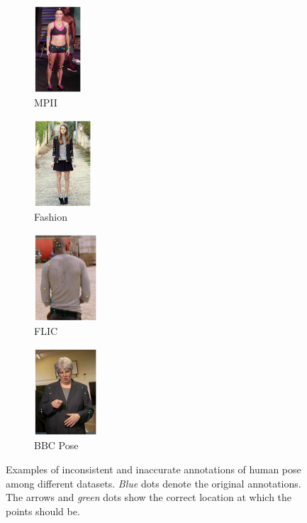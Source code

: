 \begin{figure}[t!]
    \centering
    \begin{subfigure}[b]{0.09125\textwidth}
            \includegraphics[height=3.25cm]{resources/MotivativeAnnotation/MPII}
            \caption{MPII}
    \end{subfigure}
    \hfill
    \begin{subfigure}[b]{0.1125\textwidth}
            \includegraphics[height=3.25cm]{resources/MotivativeAnnotation/FashionPose}
            \caption{Fashion}
    \end{subfigure}
  	\hfill
    \begin{subfigure}[b]{0.125\textwidth}
            \includegraphics[height=3.25cm]{resources/MotivativeAnnotation/FLIC}
            \caption{FLIC}
    \end{subfigure}
    \hfill
    \begin{subfigure}[b]{0.125\textwidth}
            \includegraphics[height=3.25cm]{resources/MotivativeAnnotation/BBCPose}
            \caption{BBC Pose}
    \end{subfigure}
    \caption{Examples of inconsistent and inaccurate annotations of human pose among different datasets. \emph{Blue} dots denote the original annotations. The arrows and \emph{green} dots show the correct location at which the points should be.
    }
    \label{fig:wrong_anno}
\end{figure}
